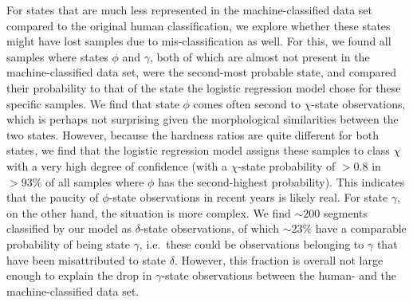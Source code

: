 \documentclass[12pt]{emulateapj}
\begin{document}
For states that are much less represented in the machine-classified data set compared to the original human classification, we explore whether these states might have lost samples due to mis-classification as well. For this, we found all samples where states $\phi$ and $\gamma$, both of which are almost not present in the 
machine-classified data set, were the second-most probable state, and compared their probability to that of the state the logistic regression model chose for these specific samples. We find that state $\phi$ comes often second to $\chi$-state observations, which is perhaps not surprising given the morphological similarities between the two states. However, because the hardness ratios are quite different for both states, we find that the logistic regression model assigns these samples to class $\chi$ with a very high degree of confidence (with a $\chi$-state probability of $>0.8$ in $>93\%$ of all samples where $\phi$ has the second-highest probability). This indicates that the paucity of $\phi$-state observations in recent years is likely real. 
For state $\gamma$, on the other hand, the situation is more complex. We find $\sim 200$ segments classified by our model as $\delta$-state observations, of which $\sim 23\%$ have a comparable probability of being state $\gamma$, i.e.\ these could be observations belonging to $\gamma$ that have been misattributed to state $\delta$. However, this fraction is overall not large enough to explain the drop in $\gamma$-state observations between the human- and the machine-classified data set.
\end{document}
